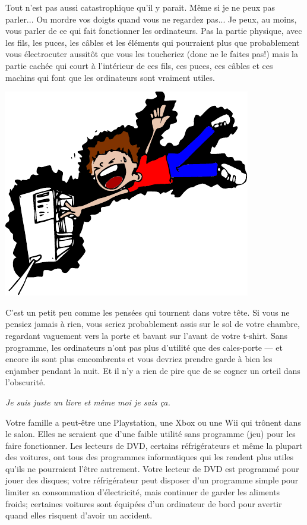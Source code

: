 Tout n'est pas aussi catastrophique qu'il y parait. Même si je ne peux pas parler... Ou mordre vos doigts quand vous ne regardez pas... Je peux, au moins, vous parler de ce qui fait fonctionner les ordinateurs. Pas la partie physique, avec les fils, les puces, les câbles et les éléments qui pourraient plus que probablement vous électrocuter aussitôt que vous les toucheriez (donc ne le faites pas!) mais la partie cachée qui court à l'intérieur de ces fils, ces puces, ces câbles et ces machins qui font que les ordinateurs sont vraiment utiles. 

\begin{center}
\includegraphics[scale=1]{images/electrocution.pdf} 
\end{center} 

C'est un petit peu comme les pensées qui tournent dans votre tête. Si vous ne pensiez jamais à rien, vous seriez probablement assis sur le sol de votre chambre, regardant vaguement vers la porte et bavant sur l'avant de votre t-shirt. Sans programme, les ordinateurs n'ont pas plus d'utilité que des cales-porte --- et encore ils sont plus emcombrents et vous devriez prendre garde à bien les enjamber pendant la nuit. Et il n'y a rien de pire que de se cogner un orteil dans l'obscurité.

\bigskip
\emph {Je suis juste un livre et même moi je sais ça.}

\bigskip
Votre famille a peut-être une Playstation, une Xbox ou une Wii qui trônent dans le salon. Elles ne seraient que d'une faible utilité sans programme (jeu) pour les faire fonctionner. Les lecteurs de DVD, certains réfrigérateurs et même la plupart des voitures, ont tous des programmes informatiques qui les rendent plus utiles qu'ils ne pourraient l'être autrement. Votre lecteur de DVD est programmé pour jouer des disques; votre réfrigérateur peut disposer d'un programme simple pour limiter sa consommation d'électricité, mais continuer de garder les aliments froids; certaines voitures sont équipées d'un ordinateur de bord pour avertir quand elles risquent d'avoir un accident.

